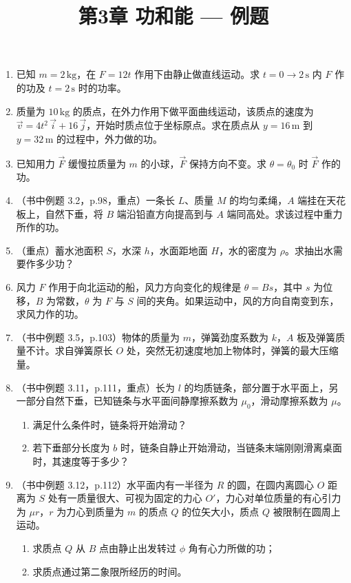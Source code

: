 \documentclass{ctexart}
\title{\textbf{第3章 功和能} --- 例题}
\author{}
\date{}
\begin{document}
\maketitle

\begin{enumerate}

\item 已知 $m = 2\,\text{kg}$，在 $F = 12t$ 作用下由静止做直线运动。求 $t = 0 \to 2\,\text{s}$ 内 $F$ 作的功及 $t = 2\,\text{s}$ 时的功率。

\item 质量为 $10\,\text{kg}$ 的质点，在外力作用下做平面曲线运动，该质点的速度为 $\vec{v} = 4t^{2}\,\vec{i} + 16\,\vec{j}$，开始时质点位于坐标原点。求在质点从 $y = 16\,\text{m}$ 到 $y = 32\,\text{m}$ 的过程中，外力做的功。

\item 已知用力 $\vec{F}$ 缓慢拉质量为 $m$ 的小球，$\vec{F}$ 保持方向不变。求 $\theta = \theta_0$ 时 $\vec{F}$ 作的功。

\item（书中例题 3.2，p.98，重点）一条长 $L$、质量 $M$ 的均匀柔绳，$A$ 端挂在天花板上，自然下垂，将 $B$ 端沿铅直方向提高到与 $A$ 端同高处。求该过程中重力所作的功。

\item（重点）蓄水池面积 $S$，水深 $h$，水面距地面 $H$，水的密度为 $\rho$。求抽出水需要作多少功？

\item 风力 $F$ 作用于向北运动的船，风力方向变化的规律是 $\theta = Bs$，其中 $s$ 为位移，$B$ 为常数，$\theta$ 为 $F$ 与 $S$ 间的夹角。如果运动中，风的方向自南变到东，求风力作的功。

\item（书中例题 3.5，p.103）物体的质量为 $m$，弹簧劲度系数为 $k$，$A$ 板及弹簧质量不计。求自弹簧原长 $O$ 处，突然无初速度地加上物体时，弹簧的最大压缩量。

\item（书中例题 3.11，p.111，重点）长为 $l$ 的均质链条，部分置于水平面上，另一部分自然下垂，已知链条与水平面间静摩擦系数为 $\mu_0$，滑动摩擦系数为 $\mu$。
\begin{enumerate}
  \item 满足什么条件时，链条将开始滑动？
  \item 若下垂部分长度为 $b$ 时，链条自静止开始滑动，当链条末端刚刚滑离桌面时，其速度等于多少？
\end{enumerate}

\item（书中例题 3.12，p.112）水平面内有一半径为 $R$ 的圆，在圆内离圆心 $O$ 距离为 $S$ 处有一质量很大、可视为固定的力心 $O'$，力心对单位质量的有心引力为 $\mu r$，$r$ 为力心到质量为 $m$ 的质点 $Q$ 的位矢大小，质点 $Q$ 被限制在圆周上运动。
\begin{enumerate}
  \item 求质点 $Q$ 从 $B$ 点由静止出发转过 $\phi$ 角有心力所做的功；
  \item 求质点通过第二象限所经历的时间。
\end{enumerate}


\end{enumerate}
\end{document}

